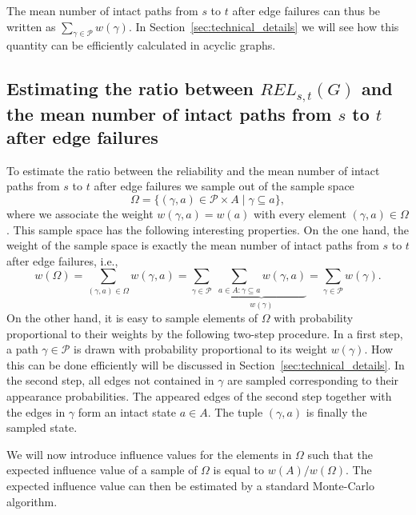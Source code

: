 \documentclass{article}
\begin{document}
The mean number of intact paths from $s$ to $t$
after edge failures can thus be
written as $\sum_{\gamma \in \mathcal{P}} w(\gamma)$. In
Section~\ref{sec:technical_details} we will see how this quantity
can be efficiently calculated in acyclic graphs.

\subsection{Estimating the ratio between
\texorpdfstring{{$\mathit{REL}_{s,t}(G)$}}{$\mathit{REL}_{s,t}(G)$} and the mean number of intact paths from
\texorpdfstring{{$s$} to {$t$}}{$s$ to $t$} after edge
failures}



To estimate the ratio between the reliability and the mean number
of intact paths from $s$ to $t$ after edge failures we
sample out of the sample space
\begin{equation*}
\Omega = \{(\gamma, a)\in\mathcal{P}\times A \mid \gamma
\subseteq a\},
\end{equation*}
where we associate the weight $w(\gamma,a)=w(a)$ with every element $(\gamma,a)\in\Omega$.
This sample space has the following
interesting properties. On the one hand, the weight of the sample
space is exactly the mean number of intact paths from $s$ to $t$
after edge failures, i.e.,
\begin{equation*}
w(\Omega)=\underset{(\gamma,a)\in\Omega}{\sum}w(\gamma,a)
=\underset{\gamma\in \mathcal{P}}{\sum}\;
\underset{w(\gamma)}{\underbrace{\underset{a\in A: \gamma \subseteq a}{\sum}w(\gamma,a)}}
=\underset{\gamma \in \mathcal{P}}{\sum}w(\gamma).
\end{equation*}
On the other hand, it is easy to sample
elements of $\Omega$ with probability proportional to their
weights by the following two-step procedure.
In a first step, a path $\gamma \in\mathcal{P}$ is drawn
with probability proportional to its weight $w(\gamma)$. How this
can be done efficiently will be discussed in
Section~\ref{sec:technical_details}. In the second step,
all edges not contained in $\gamma$ are sampled corresponding to their
appearance probabilities. The appeared edges of the second step together
with the edges in $\gamma$ form an intact state $a\in A$. The tuple
$(\gamma,a)$ is finally the sampled state.

We will now introduce influence values for the elements in $\Omega$
such that the expected influence value of a sample of $\Omega$ is
equal to $w(A)/w(\Omega)$. The expected influence value
can then be estimated by a standard \mbox{Monte-Carlo} algorithm.
\end{document}
